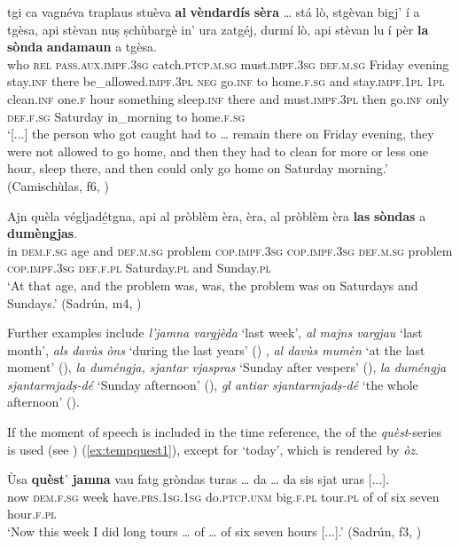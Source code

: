 \ea
\label{ex:tempdefart2}
\gll    [...] tgi ca vagnéva traplaus stuèva \textbf{al} \textbf{vèndardís} \textbf{sèra} … stá lò, stgèvan bigj’ í a tgèsa, api stèvan nuṣ ṣchùbargè in’ ura zatgéj, durmí lò, api stèvan lu í pèr \textbf{la} \textbf{sònda} \textbf{andamaun} a tgèsa.\\
{} who \textsc{rel} \textsc{pass.aux.impf.3sg} catch.\textsc{ptcp.m.sg} must.\textsc{impf.3sg} \textsc{def.m.sg} Friday evening {} stay.\textsc{inf} there be\_allowed.\textsc{impf.3pl} \textsc{neg} go.\textsc{inf} to home.\textsc{f.sg} and stay.\textsc{impf.1pl} \textsc{1pl} clean.\textsc{inf} one.\textsc{f} hour something sleep.\textsc{inf} there and must.\textsc{impf.3pl} then go.\textsc{inf} only \textsc{def.f.sg} Saturday in\_morning to home.\textsc{f.sg}\\
\glt `[...] the person who got caught had to … remain there on Friday evening, they were not allowed to go home, and then they had to clean for more or less one hour, sleep there, and then could only go home on Saturday morning.' (Camischùlas, f6, )
\z

\ea
\label{ex:tempdefart3}
\gll  Ajn quèla végljadé̱tgna, api al pròblèm èra, èra, al pròblèm èra \textbf{las} \textbf{sòndas} a \textbf{dumèngjas}.   \\
in  \textsc{dem.f.sg} age and \textsc{def.m.sg} problem \textsc{cop.impf.3sg} \textsc{cop.impf.3sg} \textsc{def.m.sg} problem \textsc{cop.impf.3sg} \textsc{def.f.pl} Saturday.\textsc{pl} and Sunday.\textsc{pl} \\
\glt `At that age, and the problem was, was, the problem was on Saturdays and Sundays.' (Sadrún, m4, )
\z



Further examples include \textit{l'jamna vargjèda} `last week', \textit{al majns vargjau} `last month', \textit{als davùs òns} `during the last years' () , \textit{al davùs mumèn} `at the last moment' (), \textit{la duméngja, sjantar vjaspras} `Sunday after vespers' (), \textit{la duméngja sjantarmjadṣ-dé} `Sunday afternoon' (), \textit{gl antiar sjantarmjadṣ-dé} `the whole afternoon' ().

If the moment of speech is included in the time reference, the   of the \textit{quèst}-series is used (see ) (\ref{ex:tempquest1}), except for `today', which is rendered by \textit{òz}.

\ea
\label{ex:tempquest1}
\gll Ùsa \textbf{quèst}’ \textbf{jamna} vau fatg gròndas turas … da … da sis sjat uras [...].  \\
now \textsc{dem.f.sg} week have.\textsc{prs.1sg.1sg} do.\textsc{ptcp.unm} big.\textsc{f.pl} tour.\textsc{pl} {} of {} of six seven hour.\textsc{f.pl}\\
\glt `Now this week I did long tours … of … of six seven hours [...].' (Sadrún, f3, )
\z

